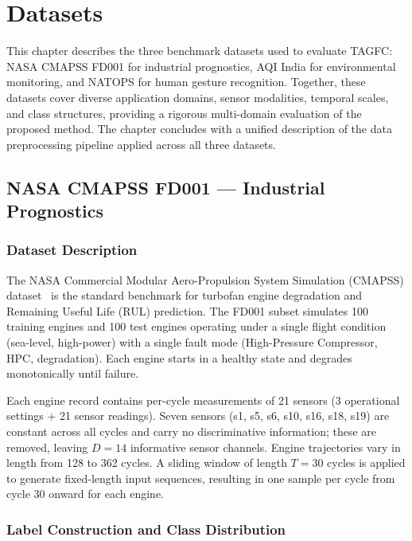 \chapter{Datasets}

This chapter describes the three benchmark datasets used to evaluate TAGFC: NASA CMAPSS FD001 for industrial prognostics, AQI India for environmental monitoring, and NATOPS for human gesture recognition. Together, these datasets cover diverse application domains, sensor modalities, temporal scales, and class structures, providing a rigorous multi-domain evaluation of the proposed method. The chapter concludes with a unified description of the data preprocessing pipeline applied across all three datasets.

\section{NASA CMAPSS FD001 — Industrial Prognostics}

\subsection{Dataset Description}

The NASA Commercial Modular Aero-Propulsion System Simulation (CMAPSS) dataset~\cite{saxena2008damage} is the standard benchmark for turbofan engine degradation and Remaining Useful Life (RUL) prediction. The FD001 subset simulates 100 training engines and 100 test engines operating under a single flight condition (sea-level, high-power) with a single fault mode (High-Pressure Compressor, HPC, degradation). Each engine starts in a healthy state and degrades monotonically until failure.

Each engine record contains per-cycle measurements of 21 sensors (3 operational settings + 21 sensor readings). Seven sensors (s1, s5, s6, s10, s16, s18, s19) are constant across all cycles and carry no discriminative information; these are removed, leaving $D = 14$ informative sensor channels. Engine trajectories vary in length from 128 to 362 cycles. A sliding window of length $T = 30$ cycles is applied to generate fixed-length input sequences, resulting in one sample per cycle from cycle 30 onward for each engine.

\subsection{Label Construction and Class Distribution}

